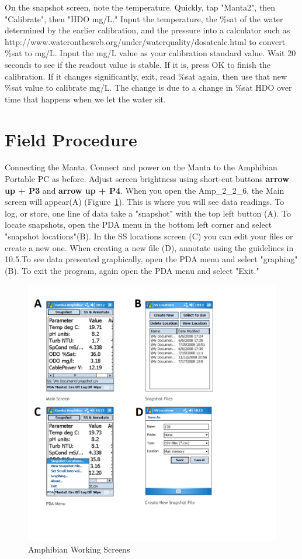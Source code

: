 \documentclass[12pt]{../SOP3}\usepackage[]{graphicx}\usepackage[]{color}
\begin{document}
\NP On the snapshot screen, note the temperature. Quickly, tap "Manta2", then "Calibrate", then "HDO mg/L." Input the temperature, the \%sat of the water determined by the earlier calibration, and the pressure into a calculator such as http://www.waterontheweb.org/under/waterquality/dosatcalc.html to convert \%sat to mg/L. Input the mg/L value as your calibration standard value. Wait 20 seconds to see if the readout value is stable. If it is, press OK to finish the calibration. If it changes significantly, exit, read \%sat again, then use that new \%sat value to calibrate mg/L. The change is due to a change in \%sat HDO over time that happens when we let the water sit. 

\section{Field Procedure}

\NP Connecting the Manta. Connect and power on the Manta to the Amphibian Portable PC as before. Adjust screen brightness using short-cut buttons \textbf{arrow up + P3} and \textbf{arrow up + P4}. When you open the Amp\_2\_2\_6, the Main screen will appear(A) (Figure~\ref{fig:AmphibianMain.png}). This is where you will see data readings. To log, or store, one line of data take a "snapshot" with the top left button (A). To locate snapshots, open the PDA menu in the bottom left corner and select "snapshot locations"(B). In the SS locations screen (C) you can edit your files or create a new one. When creating a new file (D), annotate using the guidelines in 10.5.To see data presented graphically, open the PDA menu and select "graphing" (B). To exit the program, again open the PDA menu and select "Exit."

\begin{figure}[h]
\centering
\includegraphics[scale=0.6]{AmphibianMain.png}
\caption{Amphibian Working Screens}
\label{fig:AmphibianMain.png}
\end{figure}
\end{document}
